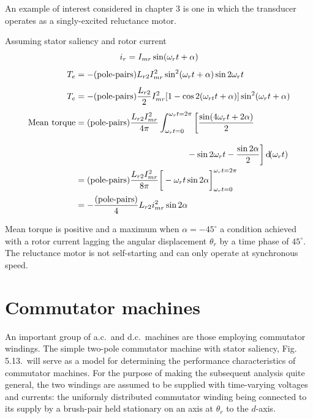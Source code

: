 \documentclass[a4paper,numbers=noenddot,12pt]{scrbook}
\begin{document}
    An example of interest considered in chapter 3 is one in which the transducer operates as a singly-excited reluctance motor.

    Assuming stator saliency and rotor current
    \begin{gather*} \label{eq:EqSect5.3}
        i_r = I_{mr} \sin (\omega_r t + \alpha) \\[1ex]
        \begin{aligned}
            T_e & = -(\text{pole-pairs}) L_{r2} I_{mr}^2 \sin^2(\omega_r t + \alpha) \sin 2 \omega_r t \\[1ex]
            T_e & = -(\text{pole-pairs}) \frac{L_{r2}}{2} I_{mr}^2 [1 - \cos 2 (\omega_{rt} t + \alpha)] \sin^2(\omega_r t + \alpha) \\[1ex]
            \text{Mean torque} & = (\text{pole-pairs}) \frac{L_{r2} I_{mr}^2}{4 \pi} \int_{\omega_r t = 0}^{\omega_r t = 2 \pi} \bigg [ \frac{\sin (4 \omega_r t + 2 \alpha)}{2} \\[2ex]
        & \hspace{13em}  -\sin 2 \omega_r t - \frac{\sin 2 \alpha}{2} \bigg ] \dif (\omega_r t) \\
        & = {(\text{pole-pairs})} \frac{L_{r2} I_{mr}^2}{8 \pi} {\bigg [ -\omega_r t \sin 2 \alpha \bigg ]}_{\omega_r t = 0}^{\omega_r t = 2 \pi} \\
        & = - \frac{(\text{pole-pairs})}{4} L_{r2} i_{mr}^2 \sin 2 \alpha
    \end{aligned}
\end{gather*}

Mean torque is positive and a maximum when $\alpha = -45^{\circ}$ a condition achieved with a rotor current lagging the angular displacement $\theta_r$ by a time phase of $45^{\circ}$. The reluctance motor is not self-starting and can only operate at synchronous speed.

\section{Commutator machines}
An important group of a.c.\ and d.c.\ machines are those employing commutator windings. The simple two-pole commutator machine with stator saliency, Fig. 5.13.\ will serve as a model for determining the performance characteristics of commutator machines. For the purpose of making the subsequent analysis quite general, the two windings are assumed to be supplied with time-varying voltages and currents: the uniformly distributed commutator winding being connected to its supply by a brush-pair held stationary on an axis at $\theta_r$ to the $d$-axis.
\end{document}
